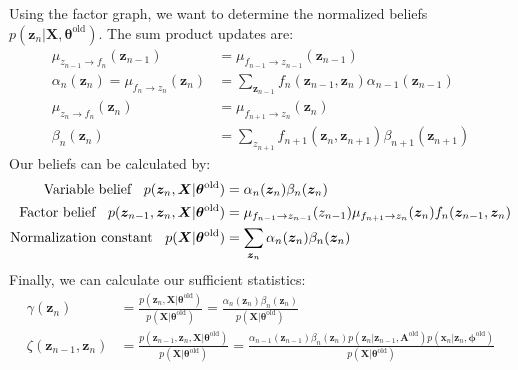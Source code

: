 \begin{itemize}
\begin{description}
		Using the factor graph, we want to determine the normalized beliefs $p(\bm{z}_n|\bm{X},\bm{\theta}^{\text{old}})$. The sum product updates are:
		\begin{equation*}
			\begin{split}
				\mu_{z_{n-1}\to f_n}(\bm{z}_{n-1}) & = \mu_{f_{n-1}\to z_{n-1}}(\bm{z}_{n-1})\\
				\alpha_n(\bm{z}_n) = \mu_{f_n\to z_n}(\bm{z}_{n}) & = \sum_{\bm{z}_{n-1}} f_n(\bm{z}_{n-1},\bm{z}_n)\alpha_{n-1}(\bm{z}_{n-1})\\
				\mu_{z_n \to f_n}(\bm{z}_n) & = \mu_{f_{n+1} \to z_n}(\bm{z}_n) \\
				\beta_n(\bm{z}_n) & = \sum_{z_{n+1}} f_{n+1}(\bm{z}_n, \bm{z}_{n+1})\beta_{n+1}(\bm{z}_{n+1})
			\end{split}
		\end{equation*}
		Our beliefs can be calculated by:
		\begin{equation*}
			\begin{split}
				\text{Variable belief } \hspace{2mm} p(\bm{z}_n,\bm{X}|\bm{\theta}^{\text{old}}) & = \alpha_n(\bm{z}_n)\beta_n(\bm{z}_n)\\
				\text{Factor belief } \hspace{2mm} p(\bm{z}_{n-1}, \bm{z}_n,\bm{X}|\bm{\theta}^{\text{old}}) & = \mu_{f_{n-1}\to z_{n-1}}(z_{n-1})\mu_{f_{n+1}\to z_n}(\bm{z}_n)f_n(\bm{z}_{n-1}, \bm{z}_n)\\
				\text{Normalization constant } \hspace{2mm} p(\bm{X}|\bm{\theta}^{\text{old}}) & = \sum_{\bm{z}_n} \alpha_n(\bm{z}_n)\beta_n(\bm{z}_n)\\
			\end{split}
		\end{equation*}
		Finally, we can calculate our sufficient statistics:
		\begin{equation*}
			\begin{split}
				\gamma(\bm{z}_n) & = \frac{p(\bm{z}_n, \bm{X}|\bm{\theta}^{\text{old}})}{p(\bm{X}|\bm{\theta}^{\text{old}})} = \frac{\alpha_n(\bm{z}_n)\beta_n(\bm{z}_n)}{p(\bm{X}|\bm{\theta}^{\text{old}})}\\
				\zeta(\bm{z}_{n-1},\bm{z}_n) & = \frac{p(\bm{z}_{n-1},\bm{z}_n,\bm{X}|\bm{\theta}^{\text{old}})}{p(\bm{X}|\bm{\theta}^{\text{old}})} = \frac{\alpha_{n-1}(\bm{z}_{n-1})\beta_n(\bm{z}_n)p(\bm{z}_n|\bm{z}_{n-1}, \bm{A}^{\text{old}})p(\bm{x}_n|\bm{z}_n, \bm{\phi}^{\text{old}})}{p(\bm{X}|\bm{\theta}^{\text{old}})}			
			\end{split}
		\end{equation*}
		

\end{description}
\end{itemize}
